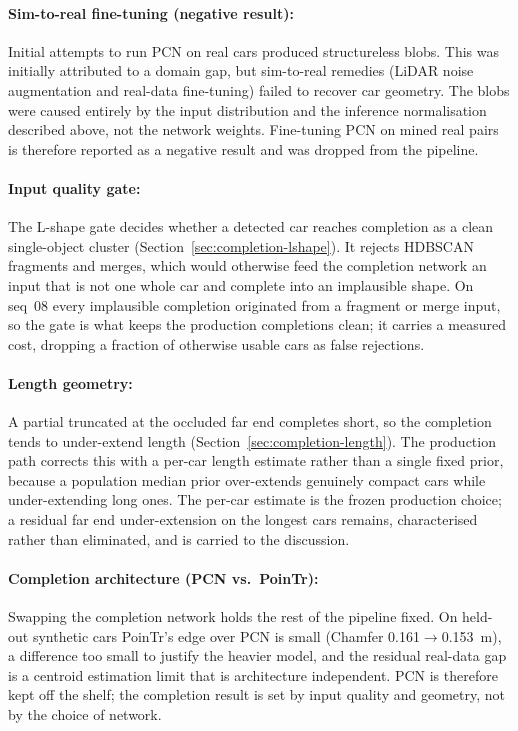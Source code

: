 \paragraph{Sim-to-real fine-tuning (negative result):}
Initial attempts to run PCN on real cars produced structureless blobs. This was initially
attributed to a domain gap, but sim-to-real remedies (LiDAR noise augmentation and real-data fine-tuning) failed to recover car geometry. The blobs were caused entirely by the
input distribution and the inference normalisation described above, not the network weights.
Fine-tuning PCN on mined real pairs is therefore reported as a negative result and was
dropped from the pipeline.

\paragraph{Input quality gate:} The L-shape gate decides whether a detected car reaches
completion as a clean single-object cluster (Section~\ref{sec:completion-lshape}). It
rejects HDBSCAN fragments and merges, which would otherwise feed the completion network an
input that is not one whole car and complete into an implausible shape. On seq~08 every
implausible completion originated from a fragment or merge input, so the gate is what keeps
the production completions clean; it carries a measured cost, dropping a fraction of
otherwise usable cars as false rejections.

\paragraph{Length geometry:} A partial truncated at the occluded far end completes short,
so the completion tends to under-extend length (Section~\ref{sec:completion-length}). The
production path corrects this with a per-car length estimate rather than a single fixed
prior, because a population median prior over-extends genuinely compact cars while
under-extending long ones. The per-car estimate is the frozen production choice; a residual
far end under-extension on the longest cars remains, characterised rather than eliminated,
and is carried to the discussion.

\paragraph{Completion architecture (PCN vs.\ PoinTr):} Swapping the completion network
holds the rest of the pipeline fixed. On held-out synthetic cars PoinTr's edge over PCN is
small (Chamfer \SI{0.161}{}$\to$\SI{0.153}{\meter}), a difference too small to justify the
heavier model, and the residual real-data gap is a centroid estimation limit that is
architecture independent. PCN is therefore kept off the shelf; the completion result is set
by input quality and geometry, not by the choice of network.

